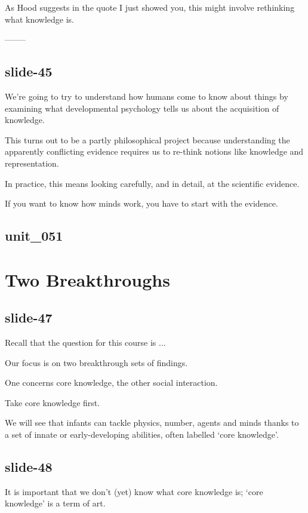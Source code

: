 \documentclass[12pt,\papersize]{extarticle}
\begin{document}
As Hood suggests in the quote I just showed you, this might involve rethinking what knowledge is.
 
--------
 
 
\subsection{slide-45}
We're going to try to understand how humans come to know about things by examining what developmental psychology tells us about the acquisition of knowledge.
 
This turns out to be a partly philosophical project because understanding the apparently conflicting evidence requires us to re-think notions like knowledge and representation.
 
In practice, this means looking carefully, and in detail, at the scientific evidence.
 
If you want to know how minds work, you have to start with the evidence.
 
 
 
\subsection{unit\_051}
 
 
\section{Two Breakthroughs}
 
 
 
\subsection{slide-47}
Recall that the question for this course is ...
 
Our focus is on two breakthrough sets of findings.
 
One concerns core knowledge, the other social interaction.
 
Take core knowledge first.
 
We will see that infants can tackle physics, number, agents and minds thanks to a set of innate or early-developing abilities, often labelled `core knowledge'.
 
 
 
\subsection{slide-48}
It is important that we don't (yet) know what core knowledge is; `core knowledge' is a term of art.
 
\end{document}
